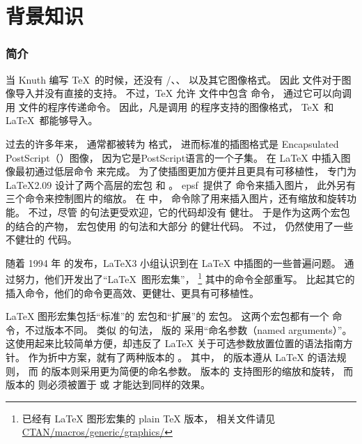 \part{背景知识}

\section{简介}\label{sec:introduction}
当 Knuth 编写 \TeX\ 的时候，还没有 /、、 以及其它图像格式。
因此  文件对于图像导入并没有直接的支持。
不过，\TeX{} 允许 文件中包含  命令，
通过它可以向调用  文件的程序传递命令。
因此，凡是调用  的程序支持的图像格式，
\TeX\ 和 \LaTeX\ 都能够导入。

过去的许多年来， 通常都被转为 格式，
进而标准的插图格式是 Encapsulated PostScript（）图像，
因为它是PostScript语言的一个子集。
在 \LaTeX{} 中插入图像最初通过低层命令  来完成。
为了使插图更加方便并且更具有可移植性，
专门为 \LaTeX 2.09 设计了两个高层的宏包  和 。
\textsf{epsf}~提供了  命令来插入图片，
此外另有三个命令来控制图片的缩放。
在  中， 命令除了用来插入图片，还有缩放和旋转功能。
不过，尽管  的句法更受欢迎，它的代码却没有  健壮。
于是作为这两个宏包的结合的产物，
 宏包使用  的句法和大部分  的健壮代码。
不过， 仍然使用了一些不健壮的  代码。

随着 1994 年 \LaTeXe{} 的发布，\LaTeX 3 小组认识到在 \LaTeX{} 中插图的一些普遍问题。
通过努力，他们开发出了“\LaTeX\ 图形宏集”，
\footnote{已经有 \LaTeX{} 图形宏集的 plain \TeX{} 版本，
	相关文件请见 \href{ftp://ctan.tug.org/tex-archive/macros/plain/graphics/}{CTAN/macros/generic/graphics/}}
其中的命令全部重写。
比起其它的插入命令，他们的命令更高效、更健壮、更具有可移植性。

\LaTeX{} 图形宏集包括“标准”的  宏包和“扩展”的  宏包。
这两个宏包都有一个  命令，不过版本不同。
类似  的句法，
 版的  采用“命名参数（named arguments）”。
这使用起来比较简单方便，却违反了 \LaTeX{} 关于可选参数放置位置的语法指南方针。
作为折中方案，就有了两种版本的 。
其中， 的版本遵从 \LaTeX{} 的语法规则，
而 的版本则采用更为简便的命名参数。
 版本的  支持图形的缩放和旋转，
而  版本的  则必须被置于  或  才能达到同样的效果。

